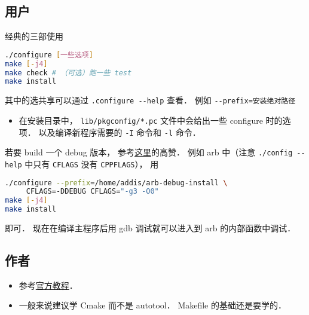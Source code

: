 
\begin{issues}
\issueDraft
\end{issues}



\subsection{用户}
经典的三部使用
\begin{lstlisting}[language=bash]
./configure [一些选项]
make [-j4]
make check # （可选）跑一些 test
make install
\end{lstlisting}
其中的选共享可以通过 \verb|.configure --help| 查看． 例如 \verb|--prefix=安装绝对路径|

\begin{itemize}
\item 在安装目录中， \verb|lib/pkgconfig/*.pc| 文件中会给出一些 configure 时的选项． 以及编译新程序需要的 \verb|-I| 命令和 \verb|-l| 命令．
\end{itemize}


若要 build 一个 debug 版本， 参考\href{https://stackoverflow.com/questions/4553735/gnu-autotools-debug-release-targets}{这里}的高赞． 例如 arb 中（注意 \verb|./config --help| 中只有 \verb|CFLAGS| 没有 \verb|CPPFLAGS|）， 用
\begin{lstlisting}[language=bash]
./configure --prefix=/home/addis/arb-debug-install \
     CFLAGS=-DDEBUG CFLAGS="-g3 -O0"
make [-j4]
make install
\end{lstlisting}
即可． 现在在编译主程序后用 gdb 调试就可以进入到 arb 的内部函数中调试．

\subsection{作者}
\begin{itemize}
\item 参考\href{https://www.gnu.org/software/automake/manual/html_node/Autotools-Introduction.html}{官方教程}．
\item 一般来说建议学 Cmake\upref{CMakeN} 而不是 autotool． Makefile 的基础还是要学的．
\end{itemize}
